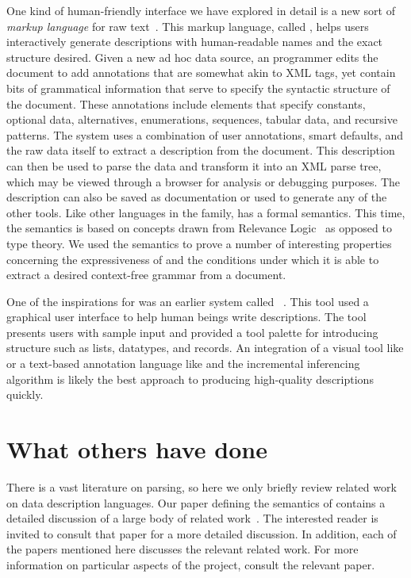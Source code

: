 \documentclass{sig-alternate}
\begin{document}
One kind of human-friendly interface we have explored in detail
is a new sort of {\em markup language} for raw text~\cite{xi+:anne}.  This
markup language, called \anne{}, helps users 
interactively generate \pads{} descriptions with human-readable names
and the exact structure desired.  Given a new ad
hoc data source, an \anne{} programmer edits the document to add
annotations that are somewhat akin to XML tags, yet contain bits of
grammatical information that serve to specify the syntactic
structure of the document. 
These annotations include elements that specify constants,
optional data, alternatives, enumerations, sequences, tabular data,
and recursive patterns. The \anne{} system uses a combination of
user annotations, smart defaults, and the raw data itself to extract a \pads{}
description from the document. This \pads{} description can then
be used to parse the data and transform it into an XML parse tree,
which may be viewed through a browser for analysis or debugging
purposes.  The description can also be saved as documentation
or used to generate any of the other \pads{} tools.  Like other
languages in the \pads{} family, \anne{} has a formal semantics.
This time, the semantics is based on concepts drawn from
Relevance Logic~\cite{anderson+:relevance-logic} as opposed to type
theory.  We used the semantics to prove a number of
interesting properties concerning the expressiveness of 
\anne{} and the conditions under which it is able 
to extract a desired context-free grammar from a document.

One of the inspirations for \anne{} was an earlier system called
\launchpads{}~\cite{planx06:launchpads}. This tool used a graphical user
interface to help human beings write descriptions.  The tool 
presents users with sample input and provided a tool palette for
introducing structure such as lists, datatypes, and records.  An
integration of a visual tool like \launchpads{} or a text-based
annotation language like \anne{} and the incremental
inferencing algorithm is likely the best approach to producing
high-quality descriptions quickly.
   

\section{What others have done}
\label{sec:related}
There is a vast literature on parsing, so here we only briefly review
related work on data description languages.  Our paper defining the
semantics of \pads{} contains a detailed discussion of a large body of
related work~\cite{Fisher+:ddca}.  The interested reader is invited to
consult that paper for a more detailed discussion.  In addition, each
of the \pads{} papers mentioned here discusses the relevant related
work.  For more information on particular aspects of the \pads{}
project, consult the relevant paper.
\end{document}
